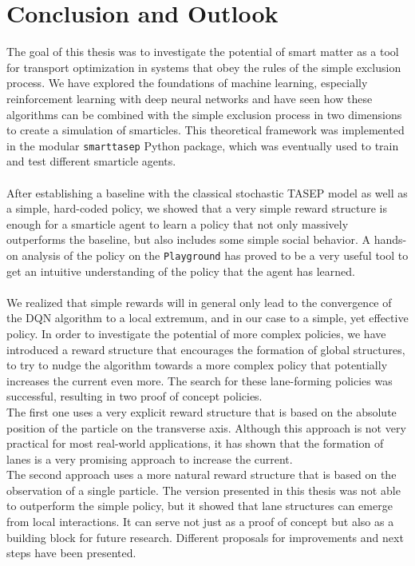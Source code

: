 \chapter{Conclusion and Outlook}
\label{chap:conclusion}
The goal of this thesis was to investigate the potential of smart matter as a tool for transport optimization in systems that obey the rules of the simple exclusion process. We have explored the foundations of machine learning, especially reinforcement learning with deep neural networks and have seen how these algorithms can be combined with the simple exclusion process in two dimensions to create a simulation of smarticles. This theoretical framework was implemented in the modular \texttt{smarttasep} Python package, which was eventually used to train and test different smarticle agents.
\\
\\
After establishing a baseline with the classical stochastic TASEP model as well as a simple, hard-coded policy, we showed that a very simple reward structure is enough for a smarticle agent to learn a policy that not only massively outperforms the baseline, but also includes some simple social behavior. A hands-on analysis of the policy on the \texttt{Playground} has proved to be a very useful tool to get an intuitive understanding of the policy that the agent has learned.
\\
\\
We realized that simple rewards will in general only lead to the convergence of the DQN algorithm to a local extremum, and in our case to a simple, yet effective policy. In order to investigate the potential of more complex policies, we have introduced a reward structure that encourages the formation of global structures, to try to nudge the algorithm towards a more complex policy that potentially increases the current even more. The search for these lane-forming policies was successful, resulting in two proof of concept policies. 
\\
The first one uses a very explicit reward structure that is based on the absolute position of the particle on the transverse axis. Although this approach is not very practical for most real-world applications, it has shown that the formation of lanes is a very promising approach to increase the current. 
\\
The second approach uses a more natural reward structure that is based on the observation of a single particle. The version presented in this thesis was not able to outperform the simple policy, but it showed that lane structures can emerge from local interactions. It can serve not just as a proof of concept but also as a building block for future research. Different proposals for improvements and next steps have been presented. 

